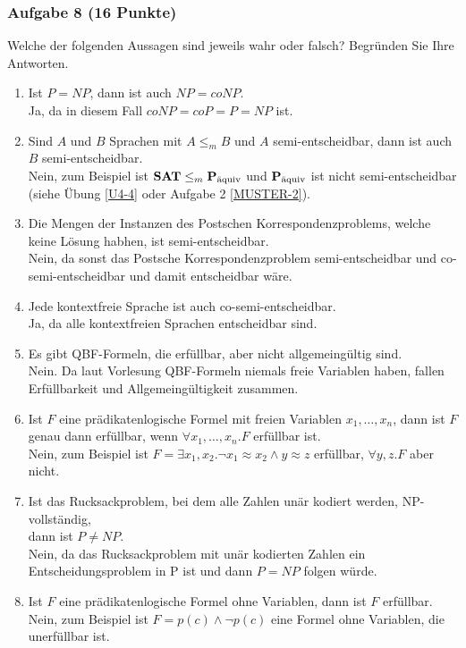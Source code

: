 \subsubsection*{Aufgabe 8 (16 Punkte)}
Welche der folgenden Aussagen sind jeweils wahr oder falsch? Begründen Sie Ihre Antworten.
\begin{enumerate}
\item Ist $P = NP$, dann ist auch $NP = coNP$. \\
\LOES Ja\POINT, da in diesem Fall $coNP = coP = P = NP$ ist.\POINT
\item Sind $A$ und $B$ Sprachen mit $A \leq_m B$ und $A$ semi-entscheidbar, dann ist auch $B$ semi-entscheidbar. \\
\LOES Nein\POINT, zum Beispiel ist $\prob{SAT} \leq_m \paq$ und $\paq$ ist nicht semi-entscheidbar (siehe Übung \ref{U4-4} oder Aufgabe 2 \ref{MUSTER-2}).\POINT
\item Die Mengen der Instanzen des Postschen Korrespondenzproblems, welche keine Lösung habhen, ist semi-entscheidbar. \\
\LOES Nein\POINT, da sonst das Postsche Korrespondenzproblem semi-entscheidbar und co-semi-entscheidbar und damit entscheidbar wäre.\POINT
\item Jede kontextfreie Sprache ist auch co-semi-entscheidbar. \\
\LOES Ja\POINT, da alle kontextfreien Sprachen entscheidbar sind.\POINT
\item Es gibt QBF-Formeln, die erfüllbar, aber nicht allgemeingültig sind. \\
\LOES Nein\POINT. Da laut Vorlesung QBF-Formeln niemals freie Variablen haben, fallen Erfüllbarkeit und Allgemeingültigkeit zusammen.\POINT
\item Ist $F$ eine prädikatenlogische Formel mit freien Variablen $x_1,\dots,x_n$, dann ist $F$ genau dann erfüllbar, wenn $\forall x_1,\dots,x_n.F$ erfüllbar ist. \\
\LOES Nein\POINT, zum Beispiel ist $F = \exists x_1, x_2.\neg x_1 \approx x_2 \land y \approx z$ erfüllbar, $\forall y,z.F$ aber nicht.\POINT
\item Ist das Rucksackproblem, bei dem alle Zahlen unär kodiert werden, NP-vollständig,\\
dann ist $P \not= NP$. \\
\LOES Nein\POINT, da das Rucksackproblem mit unär kodierten Zahlen ein Entscheidungsproblem in P ist und dann $P = NP$ folgen würde.\POINT
\item Ist $F$ eine prädikatenlogische Formel ohne Variablen, dann ist $F$ erfüllbar. \\
\LOES Nein\POINT, zum Beispiel ist $F = p(c) \land \neg p(c)$ eine Formel ohne Variablen, die unerfüllbar ist.\POINT
\end{enumerate}